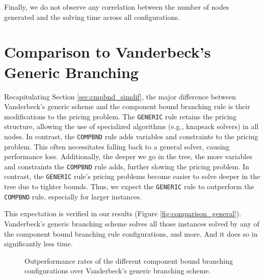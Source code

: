 Finally, we do not observe any correlation between the number of nodes generated and the solving time across all configurations.

\section{Comparison to Vanderbeck's Generic Branching}\label{sec:evaluation_comparison_generic}
Recapitulating Section \ref{sec:cmpbnd_simdif}, the major difference between Vanderbeck's generic scheme and the component bound branching rule is their modifications to the pricing problem. The \texttt{GENERIC} rule retains the pricing structure, allowing the use of specialized algorithms (e.g., knapsack solvers) in all nodes. In contrast, the \texttt{COMPBND} rule adds variables and constraints to the pricing problem. This often necessitates falling back to a general \MIP{} solver, causing performance loss. Additionally, the deeper we go in the tree, the more variables and constraints the \texttt{COMPBND} rule adds, further slowing the pricing problem. In contrast, the \texttt{GENERIC} rule's pricing problems become easier to solve deeper in the tree due to tighter bounds. Thus, we expect the \texttt{GENERIC} rule to outperform the \texttt{COMPBND} rule, especially for larger instances.

This expectation is verified in our results (Figure \ref{fig:comparison_general}). Vanderbeck's generic branching scheme solves all those instances solved by any of the component bound branching rule configurations, and more. And it does so in significantly less time.

\begin{figure}
	\centering

	\begin{subfigure}{0.495\textwidth}
		\centering
		
	\end{subfigure}
	\hfill
	\begin{subfigure}{0.495\textwidth}
		\centering
		
	\end{subfigure}

	\caption{Outperformance rates of the different component bound branching configurations over Vanderbeck's generic branching scheme.}
	\label{fig:comparison_outperform}
\end{figure}

